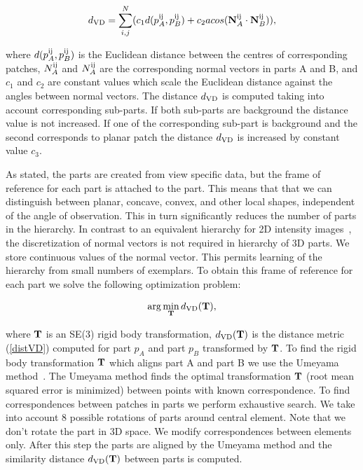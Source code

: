 \documentclass[letterpaper,10pt,conference]{ieeeconf}  %
\begin{document}
\begin{equation}
\label{distVD}
 d_{\rm VD}=\sum_{i,j}^N ( c_1 d(p_A^{\rm ij}, p_B^{\rm ij}) + c_2 acos({\bf N}_A^{\rm ij} \cdot {\bf N}_B^{\rm ij})),
\end{equation}

where $d(p_A^{\rm ij}, p_B^{\rm ij})$ is the Euclidean distance between the centres of corresponding patches, $N_A^{\rm ij}$ and $N_A^{\rm ij}$ are the corresponding normal vectors in parts A and B, and $c_1$ and $c_2$ are constant values which scale the Euclidean distance against the angles between normal vectors. The distance $d_{\rm VD}$ is computed taking into account corresponding sub-parts. If both sub-parts are background the distance value is not increased. If one of the corresponding sub-part is background and the second corresponds to planar patch the distance $d_{\rm VD}$ is increased by constant value $c_3$.

As stated, the parts are created from view specific data, but the frame of reference for each part is attached to the part. This means that that we can distinguish between planar, concave, convex, and other local shapes, independent of the angle of observation. This in turn significantly reduces the number of parts in the hierarchy. In contrast to an equivalent hierarchy for 2D intensity images~\cite{Fiedler2014}, the discretization of normal vectors is not required in hierarchy of 3D parts. We store continuous values of the normal vector. This permits learning of the hierarchy from small numbers of exemplars. To obtain this frame of reference for each part we solve the following optimization problem:

\begin{equation}
\label{optVI}
 \arg\min_{\bf T} d_{\rm VD}({\bf T}),
\end{equation}

where ${\bf T}$ is an SE(3) rigid body transformation, $d_{\rm VD}({\bf T})$ is the distance metric (\ref{distVD}) computed for part $p_A$ and part $p_B$ transformed by ${\bf T}$. To find the rigid body transformation ${\bf T}$ which aligns part A and part B we use the Umeyama method~\cite{Umeyama1991}. The Umeyama method finds the optimal transformation ${\bf T}$ (root mean squared error is minimized) between points with known correspondence. To find correspondences between patches in parts we perform exhaustive search. We take into account 8 possible rotations of parts around central element. Note that we don't rotate the part in 3D space. We modify correspondences between elements only. After this step the parts are aligned by the Umeyama method and the similarity distance $d_{\rm VD}({\bf T})$ between parts is computed. 
\end{document}
